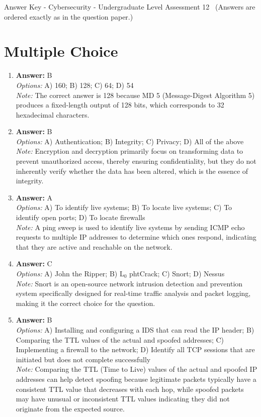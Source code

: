 \documentclass[12pt]{article}
\begin{document}
\begin{center}
Answer Key - Cybersecurity - Undergraduate Level Assessment 12 \
\small (Answers are ordered exactly as in the question paper.)
\end{center}

\section*{Multiple Choice}
\begin{enumerate}[label=\arabic*.]
\item \textbf{Answer:} B
\\ \textit{Options:} A) 160; B) 128; C) 64; D) 54
\\ \textit{Note:} The correct answer is 128 because MD 5 (Message-Digest Algorithm 5) produces a fixed-length output of 128 bits, which corresponds to 32 hexadecimal characters.
\item \textbf{Answer:} B
\\ \textit{Options:} A) Authentication; B) Integrity; C) Privacy; D) All of the above
\\ \textit{Note:} Encryption and decryption primarily focus on transforming data to prevent unauthorized access, thereby ensuring confidentiality, but they do not inherently verify whether the data has been altered, which is the essence of integrity.
\item \textbf{Answer:} A
\\ \textit{Options:} A) To identify live systems; B) To locate live systems; C) To identify open ports; D) To locate firewalls
\\ \textit{Note:} A ping sweep is used to identify live systems by sending ICMP echo requests to multiple IP addresses to determine which ones respond, indicating that they are active and reachable on the network.
\item \textbf{Answer:} C
\\ \textit{Options:} A) John the Ripper; B) L$_{0}$ phtCrack; C) Snort; D) Nessus
\\ \textit{Note:} Snort is an open-source network intrusion detection and prevention system specifically designed for real-time traffic analysis and packet logging, making it the correct choice for the question.
\item \textbf{Answer:} B
\\ \textit{Options:} A) Installing and configuring a IDS that can read the IP header; B) Comparing the TTL values of the actual and spoofed addresses; C) Implementing a firewall to the network; D) Identify all TCP sessions that are initiated but does not complete successfully
\\ \textit{Note:} Comparing the TTL (Time to Live) values of the actual and spoofed IP addresses can help detect spoofing because legitimate packets typically have a consistent TTL value that decreases with each hop, while spoofed packets may have unusual or inconsistent TTL values indicating they did not originate from the expected source.
\end{enumerate}
\end{document}
